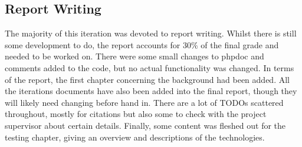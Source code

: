 \subsection{Report Writing}
The majority of this iteration was devoted to report writing. Whilst there is still some development to do, the report accounts for 30\% of the final grade and needed to be worked on. There were some small changes to phpdoc and comments added to the code, but no actual functionality was changed. In terms of the report, the first chapter concerning the background had been added. All the iterations documents have also been added into the final report, though they will likely need changing before hand in. There are a lot of TODOs scattered throughout, mostly for citations but also some to check with the project supervisor about certain details. Finally, some content was fleshed out for the testing chapter, giving an overview and descriptions of the technologies.
\newpage